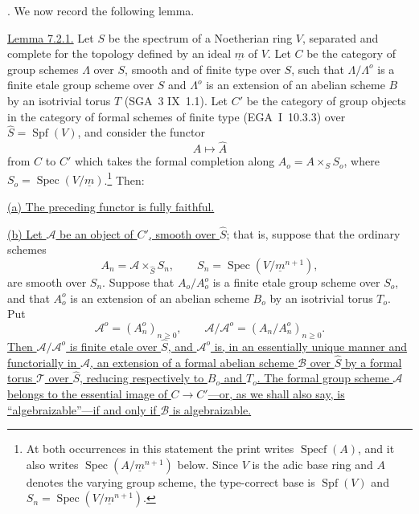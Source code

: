 
\medskip
{}. We now record the following lemma.

\medskip
\noindent
\underline{Lemma 7.2.1.} Let $S$ be the spectrum of a Noetherian ring
$V$, separated and complete for the topology defined by an ideal
$\underline m$ of $V$.  Let $C$ be the category of group schemes
$\Lambda$ over $S$, smooth and of finite type over $S$, such that
$\Lambda/\Lambda^o$ is a finite etale group scheme over $S$ and
$\Lambda^o$ is an extension of an abelian scheme $B$ by an isotrivial
torus $T$ (SGA~3 IX~1.1).  Let $C'$ be the category of group objects
in the category of formal schemes of finite type (EGA~I~10.3.3) over
$\widehat S=\operatorname{Spf}(V)$, and consider the functor
\[
 A\longmapsto\widehat A
\]
from $C$ to $C'$ which takes the formal completion along
$A_o=A\times_S S_o$, where
$S_o=\operatorname{Spec}(V/\underline m)$.\footnote{At both occurrences
in this statement the print writes $\operatorname{Specf}(A)$, and it
also writes $\operatorname{Spec}(A/\underline m^{n+1})$ below.  Since
$V$ is the adic base ring and $A$ denotes the varying group scheme,
the type-correct base is $\operatorname{Spf}(V)$ and
$S_n=\operatorname{Spec}(V/\underline m^{n+1})$.} Then:

\smallskip
\noindent
\underline{(a) The preceding functor is fully faithful.}

\smallskip
\noindent
\underline{(b) Let $\mathcal A$ be an object of $C'$, smooth over
$\widehat S$}; that is, suppose that the ordinary schemes
\[
 A_n=\mathcal A\times_{\widehat S}S_n,
 \qquad
 S_n=\operatorname{Spec}(V/\underline m^{n+1}),
\]
are smooth over $S_n$.  Suppose that $A_o/A_o^o$ is a finite etale
group scheme over $S_o$, and that $A_o^o$ is an extension of an
abelian scheme $B_o$ by an isotrivial torus $T_o$.  Put
\[
 \mathcal A^o=(A_n^o)_{n\geq0},
 \qquad
 \mathcal A/\mathcal A^o=(A_n/A_n^o)_{n\geq0}.
\]
\underline{Then $\mathcal A/\mathcal A^o$ is finite etale over
$\widehat S$, and $\mathcal A^o$ is, in an essentially unique manner
and functorially in $\mathcal A$, an extension of a formal abelian
scheme $\mathcal B$ over $\widehat S$ by a formal torus $\mathcal T$
over $\widehat S$, reducing respectively to $B_o$ and $T_o$.  The
formal group scheme $\mathcal A$ belongs to the essential image of
$C\longrightarrow C'$---or, as we shall also say, is
``algebraizable''---if and only if $\mathcal B$ is algebraizable.}

